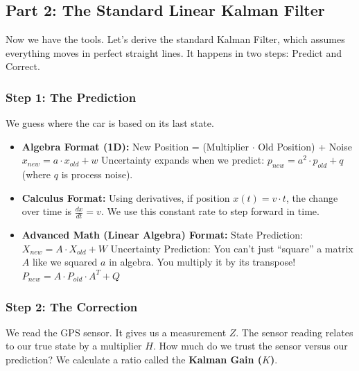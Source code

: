 \documentclass[
]{article}
\begin{document}
\subsection{Part 2: The Standard Linear Kalman
Filter}\label{part-2-the-standard-linear-kalman-filter}

Now we have the tools. Let's derive the standard Kalman Filter, which
assumes everything moves in perfect straight lines. It happens in two
steps: Predict and Correct.

\subsubsection{Step 1: The Prediction}\label{step-1-the-prediction}

We guess where the car is based on its last state.

\begin{itemize}
\item
  \textbf{Algebra Format (1D):} New Position = (Multiplier \(\cdot\) Old
  Position) + Noise \(x_{new} = a \cdot x_{old} + w\) Uncertainty
  expands when we predict: \(p_{new} = a^2 \cdot p_{old} + q\) (where
  \(q\) is process noise).
\item
  \textbf{Calculus Format:} Using derivatives, if position
  \(x(t) = v \cdot t\), the change over time is \(\frac{dx}{dt} = v\).
  We use this constant rate to step forward in time.
\item
  \textbf{Advanced Math (Linear Algebra) Format:} State Prediction:
  \(X_{new} = A \cdot X_{old} + W\) Uncertainty Prediction: You can't
  just ``square'' a matrix \(A\) like we squared \(a\) in algebra. You
  multiply it by its transpose!
  \(P_{new} = A \cdot P_{old} \cdot A^T + Q\)
\end{itemize}

\subsubsection{Step 2: The Correction}\label{step-2-the-correction}

We read the GPS sensor. It gives us a measurement \(Z\). The sensor
reading relates to our true state by a multiplier \(H\). How much do we
trust the sensor versus our prediction? We calculate a ratio called the
\textbf{Kalman Gain (\(K\))}.
\end{document}
